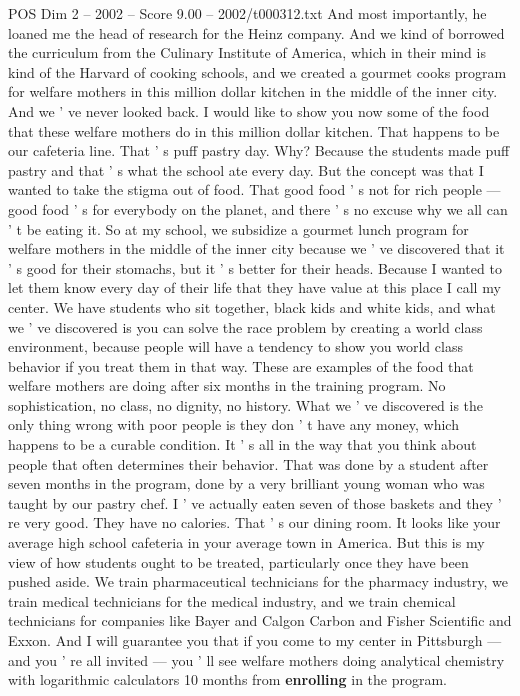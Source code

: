 \begin{textsample}{POS Dim 2 – 2002 – Score 9.00 – 2002/t000312.txt}
And most importantly, he loaned me the head of research for the Heinz company.
And we kind of borrowed the curriculum from the Culinary Institute of America, which in their mind is kind of the Harvard of cooking schools, and we created a gourmet cooks program for welfare mothers in this million dollar kitchen in the middle of the inner city.
And we ' ve never looked back.
I would like to show you now some of the food that these welfare mothers do in this million dollar kitchen.
That happens to be our cafeteria line.
That ' s puff pastry day.
Why?
Because the students made puff pastry and that ' s what the school ate every day.
But the concept was that I wanted to take the stigma out of food.
That good food ' s not for rich people — good food ' s for everybody on the planet, and there ' s no excuse why we all can ' t be eating it.
So at my school, we subsidize a gourmet lunch program for welfare mothers in the middle of the inner city because we ' ve discovered that it ' s good for their stomachs, but it ' s better for their heads.
Because I wanted to let them know every day of their life that they have value at this place I call my center.
We have students who sit together, black kids and white kids, and what we ' ve discovered is you can solve the race problem by creating a world class environment, because people will have a tendency to show you world class behavior if you treat them in that way.
These are examples of the food that welfare mothers are doing after six months in the training program.
No sophistication, no class, no dignity, no history.
What we ' ve discovered is the only thing wrong with poor people is they don ' t have any money, which happens to be a curable condition.
It ' s all in the way that you think about people that often determines their behavior.
That was done by a student after seven months in the program, done by a very brilliant young woman who was taught by our pastry chef.
I ' ve actually eaten seven of those baskets and they ' re very good.
They have no calories.
That ' s our dining room.
It looks like your average high school cafeteria in your average town in America.
But this is my view of how students ought to be treated, particularly once they have been pushed aside.
We train pharmaceutical technicians for the pharmacy industry, we train medical technicians for the medical industry, and we train chemical technicians for companies like Bayer and Calgon Carbon and Fisher Scientific and Exxon.
And I will guarantee you that if you come to my center in Pittsburgh — and you ' re all invited — you ' ll see welfare mothers doing analytical chemistry with logarithmic calculators 10 months from \textbf{enrolling} in the program.

\end{textsample}
